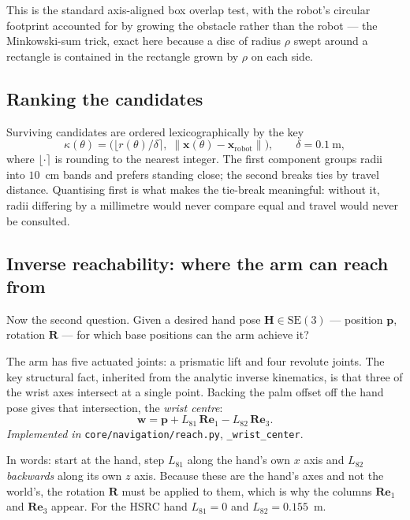 \documentclass[11pt,a4paper]{article}
\newcommand{\SE}{\mathrm{SE}}
\newcommand{\norm}[1]{\left\lVert #1 \right\rVert}
\begin{document}
This is the standard axis-aligned box overlap test, with the robot's circular
footprint accounted for by growing the obstacle rather than the robot --- the
Minkowski-sum trick, exact here because a disc of radius $\rho$ swept around a
rectangle is contained in the rectangle grown by $\rho$ on each side.

\subsection{Ranking the candidates}

Surviving candidates are ordered lexicographically by the key
\begin{equation}
\kappa(\theta) = \Big( \big\lfloor r(\theta)/\delta \big\rceil,\;
\norm{\mathbf{x}(\theta) - \mathbf{x}_{\text{robot}}} \Big),
\qquad \delta = 0.1\ \text{m},
\end{equation}
where $\lfloor\cdot\rceil$ is rounding to the nearest integer. The first
component groups radii into $10$~cm bands and prefers standing close; the second
breaks ties by travel distance. Quantising first is what makes the tie-break
meaningful: without it, radii differing by a millimetre would never compare
equal and travel would never be consulted.

\subsection{Inverse reachability: where the arm can reach from}

Now the second question. Given a desired hand pose
$\mathbf{H} \in \SE(3)$ --- position $\mathbf{p}$, rotation $\mathbf{R}$ --- for
which base positions can the arm achieve it?

The arm has five actuated joints: a prismatic lift and four revolute joints. The
key structural fact, inherited from the analytic inverse kinematics, is that
three of the wrist axes intersect at a single point. Backing the palm offset off
the hand pose gives that intersection, the \emph{wrist centre}:
\begin{equation}
\boxed{\;
\mathbf{w} = \mathbf{p} + L_{81}\, \mathbf{R}\mathbf{e}_1 - L_{82}\, \mathbf{R}\mathbf{e}_3 .
\;}
\label{eq:wrist}
\end{equation}
\textit{Implemented in} \texttt{core/navigation/reach.py}, \texttt{\_wrist\_center}.

In words: start at the hand, step $L_{81}$ along the hand's own $x$ axis and
$L_{82}$ \emph{backwards} along its own $z$ axis. Because these are the hand's
axes and not the world's, the rotation $\mathbf{R}$ must be applied to them,
which is why the columns $\mathbf{R}\mathbf{e}_1$ and $\mathbf{R}\mathbf{e}_3$
appear. For the HSRC hand $L_{81} = 0$ and $L_{82} = 0.155$~m.
\end{document}
